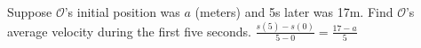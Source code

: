 {Suppose $\mathcal{O}$'s initial position was $a$ (meters) and 5s later was 17m.  Find $\mathcal{O}$'s average velocity during the first five seconds.}
{$\frac{s(5)-s(0)}{5-0}=\frac{17-a}{5}$}